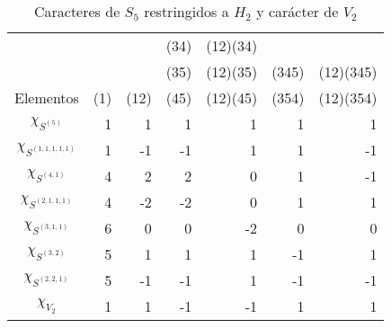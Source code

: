 \documentclass[12pt]{book}
\theoremstyle{definition}
\newcounter{in}
\begin{document}
\begin{table}[!hbtp]
  \centering
  \begin{tabular}{c |r r r r r r}
    &     &      & (34) & (12)(34) &       &  \\
    &     &      & (35) & (12)(35) & (345) & (12)(345) \\
    Elementos & (1) & (12) & (45) & (12)(45) & (354) & (12)(354) \\
    \hline
    $\chi_{S^{(5)}}$ & 1 & 1  & 1  & 1 & 1 & 1 \\
    $\chi_{S^{(1,1,1,1,1)}}$ & 1 & -1 & -1 & 1 & 1 & -1\\
    $\chi_{S^{(4,1)}}$ & 4 & 2  & 2  & 0 & 1 & -1\\
    $\chi_{S^{(2,1,1,1)}}$ & 4 & -2 & -2 & 0 & 1 & 1\\
    $\chi_{S^{(3,1,1)}}$ & 6 & 0  & 0  & -2& 0 & 0\\
    $\chi_{S^{(3,2)}}$ & 5 & 1  & 1  & 1 & -1& 1\\
    $\chi_{S^{(2,2,1)}}$ & 5 & -1 & -1 & 1 & -1& -1\\
    \hline
    $\chi_{V_{2}}$ & 1 & 1 & -1 & -1& 1 & 1\\
  \end{tabular}

  \caption{Caracteres de $S_{5}$ restringidos a $H_{2}$ y carácter de $V_{2}$}
  \label{tab:clanes-H_2-5}
\end{table}
\end{document}
